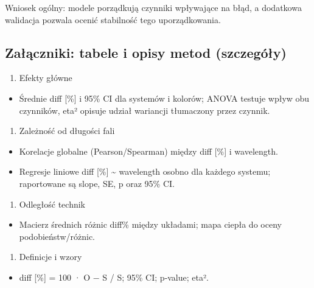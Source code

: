 \documentclass[
  10pt,
]{article}
\providecommand{\tightlist}{%
  \setlength{\itemsep}{0pt}\setlength{\parskip}{0pt}}
\begin{document}
Wniosek ogólny: modele porządkują czynniki wpływające na błąd, a
dodatkowa walidacja pozwala ocenić stabilność tego uporządkowania.

\subsection{Załączniki: tabele i opisy metod
(szczegóły)}\label{zaux142ux105czniki-tabele-i-opisy-metod-szczeguxf3ux142y}

\begin{enumerate}
\def\labelenumi{\arabic{enumi}.}
\tightlist
\item
  Efekty główne
\end{enumerate}

\begin{itemize}
\tightlist
\item
  Średnie \textbar diff\textbar{} {[}\%{]} i 95\% CI dla systemów i
  kolorów; ANOVA testuje wpływ obu czynników, eta² opisuje udział
  wariancji tłumaczony przez czynnik.
\end{itemize}

\begin{enumerate}
\def\labelenumi{\arabic{enumi}.}
\setcounter{enumi}{1}
\tightlist
\item
  Zależność od długości fali
\end{enumerate}

\begin{itemize}
\tightlist
\item
  Korelacje globalne (Pearson/Spearman) między \textbar diff\textbar{}
  {[}\%{]} i wavelength.
\item
  Regresje liniowe \textbar diff\textbar{} {[}\%{]} \textasciitilde{}
  wavelength osobno dla każdego systemu; raportowane są slope, SE, p
  oraz 95\% CI.
\end{itemize}

\begin{enumerate}
\def\labelenumi{\arabic{enumi}.}
\setcounter{enumi}{2}
\tightlist
\item
  Odległość technik
\end{enumerate}

\begin{itemize}
\tightlist
\item
  Macierz średnich różnic \textbar diff\textbar\% między układami; mapa
  ciepła do oceny podobieństw/różnic.
\end{itemize}

\begin{enumerate}
\def\labelenumi{\arabic{enumi}.}
\setcounter{enumi}{3}
\tightlist
\item
  Definicje i wzory
\end{enumerate}

\begin{itemize}
\tightlist
\item
  \textbar diff\textbar{} {[}\%{]} = 100 · \textbar O − S\textbar{} / S;
  95\% CI; p‑value; eta².
\end{itemize}
\end{document}
